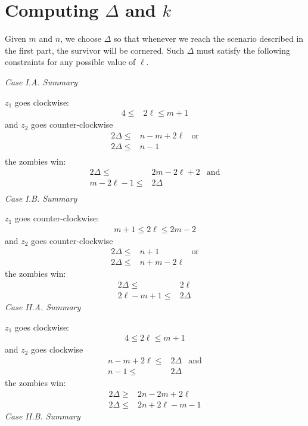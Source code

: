 \section{Computing $\Delta$ and $k$ \label{thm q_m_n 4}}

 Given $m$ and $n$, we choose $\Delta$ so that whenever we reach
 the scenario described in the first part, the survivor will be cornered.
 Such $\Delta$ must satisfy the following constraints for any possible
 value of $\ell$.

 \textit{Case I.A. Summary}

 $z_1$ goes clockwise:
 \begin{align*}
  4 \leq & 2 \ell \leq m + 1
 \end{align*}
 and $z_2$ goes counter-clockwise
 \begin{align*}
  2 \Delta \leq & n - m + 2\ell & \text{or} \\
  2 \Delta \leq & n - 1                     \\
 \end{align*}
 the zombies win:
 \begin{align*}
  2 \Delta \leq      & 2 m- 2 \ell + 2 & \text{and} \\
  m - 2\ell  -1 \leq & 2 \Delta                     \\
 \end{align*}
 \textit{Case I.B. Summary}

 $z_1$ goes counter-clockwise:
 \begin{align*}
  m + 1 \leq 2 \ell \leq 2m - 2
 \end{align*}
 and $z_2$ goes counter-clockwise
 \begin{align*}
  2 \Delta \leq & n + 1         & \text{or} \\
  2 \Delta \leq & n + m - 2\ell
 \end{align*}
 the zombies win:
 \begin{align*}
  2 \Delta \leq      & 2 \ell   \\
  2\ell - m + 1 \leq & 2 \Delta
 \end{align*}
 \textit{Case II.A. Summary}

 $z_1$ goes clockwise:
 \begin{align*}
  4 \leq 2 \ell \leq m + 1
 \end{align*}
 and $z_2$ goes clockwise
 \begin{align*}
  n -m + 2\ell \leq & 2 \Delta & \text{and} \\
  n-1 \leq          & 2 \Delta
 \end{align*}
 the zombies win:
 \begin{align*}
  2 \Delta \geq & 2n - 2m + 2\ell    \\
  2 \Delta \leq & 2n + 2\ell - m - 1
 \end{align*}
 \textit{Case II.B. Summary}

